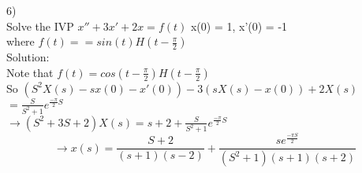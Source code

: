 \documentclass[12pt]{article}
\begin{document}
	6)\\
	Solve the IVP $x'' + 3x' + 2x = f(t)$ x(0) = 1, x'(0) = -1\\
	where $f(t) = = sin(t) H(t-\frac{\pi}{2})$\\
	Solution:\\
	Note that $f(t) = cos(t-\frac{\pi}{2})H(t-\frac{\pi}{2})$\\
	So $(S^2X(s) - sx(0) - x'(0)) - 3(sX(s) - x(0)) + 2X(s)$\\
	$= \frac{S}{S^2 + 1}e^{\frac{-\pi}{2}S}$\\
	$\rightarrow (S^2 + 3S + 2)X(s) = s + 2 + \frac{S}{S^2 + 1}e^{\frac{-\pi}{2}S}$\\
	$$\rightarrow x(s) = \frac{S+2}{(s+1)(s-2)} + \frac{se^{\frac{-\pi S}{2}}}{(S^2 + 1)(s+1)(s+2)}$$
	
	
	
\end{document}
